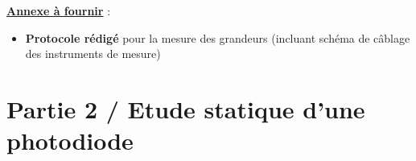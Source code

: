 \noindent
{}

\medskip

\noindent
\underline{\textbf{Annexe à fournir}} :

\begin{itemize}[label=$\square$]
	\item \textbf{Protocole rédigé} pour la mesure des grandeurs (incluant schéma de câblage des instruments de mesure)
\end{itemize}

 

\medskip

\noindent
\begin{minipage}{0.23\linewidth}
\end{minipage}
\hfill
\begin{minipage}{0.23\linewidth}
\end{minipage}
\hfill
\begin{minipage}{0.23\linewidth}
\end{minipage}
\hfill
\begin{minipage}{0.23\linewidth}
\end{minipage}


\section{Partie 2 / Etude statique d'une photodiode}

\noindent
\begin{minipage}{0.48\linewidth}
\end{minipage}
\hfill
\begin{minipage}{0.48\linewidth}
\end{minipage}

